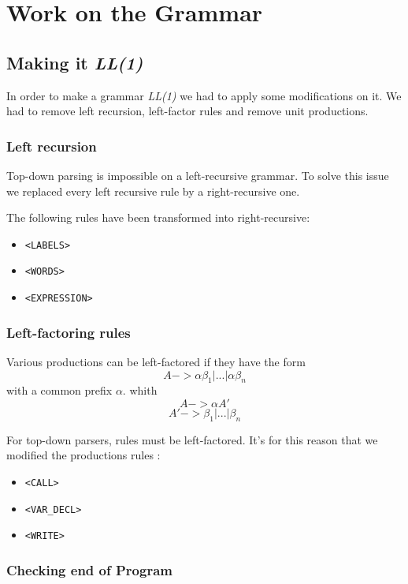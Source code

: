 \newpage\cleardoublepage{}
\section{Work on the Grammar}


\subsection{Making it \emph{LL(1)}}
In order to make a grammar \emph{LL(1)} we had to apply some modifications on it. We had to remove left recursion, left-factor rules and remove unit productions.

\subsubsection{Left recursion}

Top-down parsing is impossible on a left-recursive grammar. To solve this issue we replaced every left recursive rule by a right-recursive one.

The following rules have been transformed into right-recursive:
\begin{itemize}
	\item \verb!<LABELS>!
	\item \verb!<WORDS>!
	\item \verb!<EXPRESSION>!
\end{itemize}


\subsubsection{Left-factoring rules}
Various productions can be left-factored if they have the form
$$A -> \alpha \beta_{1} | ... | \alpha\beta_{n}$$
with a common prefix $\alpha$.
whith
$$A -> \alpha A'$$
$$A' -> \beta_{1} | ... | \beta_{n}$$

For top-down parsers, rules must be left-factored.
It's for this reason that we modified the productions rules :
\begin{itemize}
	\item \verb!<CALL>!
	\item \verb!<VAR_DECL>!
	\item \verb!<WRITE>!
\end{itemize}


\subsubsection{Checking end of Program}

